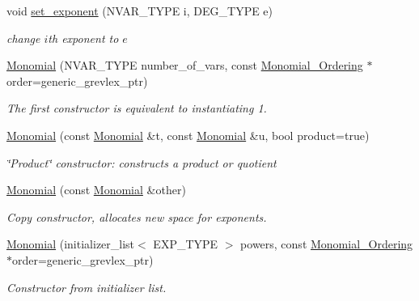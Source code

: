 \begin{Indent}
\begin{DoxyCompactItemize}
\mbox{\label{group__polygroup_a6f28aa6d15979b018003908937155052}} 
void \hyperlink{group__polygroup_a6f28aa6d15979b018003908937155052}{set\+\_\+exponent} (N\+V\+A\+R\+\_\+\+T\+Y\+PE i, D\+E\+G\+\_\+\+T\+Y\+PE e)
\begin{DoxyCompactList}\small\item\em change $i$th exponent to $e$ \end{DoxyCompactList}\item 
\mbox{\label{group__polygroup_a3c710f9d6f7c7e0addc2779a037042dd}} 
\hyperlink{group__polygroup_a3c710f9d6f7c7e0addc2779a037042dd}{Monomial} (N\+V\+A\+R\+\_\+\+T\+Y\+PE number\+\_\+of\+\_\+vars, const \hyperlink{group__orderinggroup_class_monomial___ordering}{Monomial\+\_\+\+Ordering} $\ast$order=generic\+\_\+grevlex\+\_\+ptr)
\begin{DoxyCompactList}\small\item\em The first constructor is equivalent to instantiating 1. \end{DoxyCompactList}\item 
\hyperlink{group__polygroup_aeccfe12ba582763df3cf7e83cffcd71f}{Monomial} (const \hyperlink{group__polygroup_class_monomial}{Monomial} \&t, const \hyperlink{group__polygroup_class_monomial}{Monomial} \&u, bool product=true)
\begin{DoxyCompactList}\small\item\em \char`\"{}\+Product\char`\"{} constructor\+: constructs a product or quotient \end{DoxyCompactList}\item 
\mbox{\label{group__polygroup_ad6968b542cf22f8bc24053fb48782dcc}} 
\hyperlink{group__polygroup_ad6968b542cf22f8bc24053fb48782dcc}{Monomial} (const \hyperlink{group__polygroup_class_monomial}{Monomial} \&other)
\begin{DoxyCompactList}\small\item\em Copy constructor, allocates new space for exponents. \end{DoxyCompactList}\item 
\hyperlink{group__polygroup_a8b9c7bc9d5b286adb11ccc39471b00c4}{Monomial} (initializer\+\_\+list$<$ E\+X\+P\+\_\+\+T\+Y\+PE $>$ powers, const \hyperlink{group__orderinggroup_class_monomial___ordering}{Monomial\+\_\+\+Ordering} $\ast$order=generic\+\_\+grevlex\+\_\+ptr)
\begin{DoxyCompactList}\small\item\em Constructor from initializer list. \end{DoxyCompactList}\item 

\end{DoxyCompactItemize}
\end{Indent}
